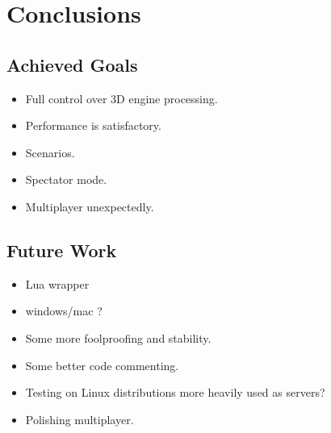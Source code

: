 
\chapter{Conclusions}

\section{Achieved Goals}
\begin{itemize}
\item Full control over 3D engine processing.
\item Performance is satisfactory.
\item Scenarios.
\item Spectator mode.
\item Multiplayer unexpectedly.
\end{itemize}

\section{Future Work}
\begin{itemize}
\item Lua wrapper
\item windows/mac ?
\item Some more foolproofing and stability.
\item Some better code commenting.
\item Testing on Linux distributions more heavily used as servers? 
\item Polishing multiplayer.
\end{itemize}
